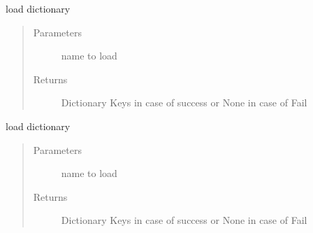 \documentclass[letterpaper,10pt,english]{sphinxmanual}
\begin{document}

\begin{fulllineitems}
\label{\detokenize{algorithms:repository.repository_service.load_carriers}}
\sphinxAtStartPar
load dictionary
\begin{quote}\begin{description}
\item[{Parameters}] \leavevmode
\sphinxAtStartPar
{} \textendash{} name to load

\item[{Returns}] \leavevmode
\sphinxAtStartPar
Dictionary Keys in case of success or None in case of Fail

\end{description}\end{quote}

\end{fulllineitems}


\begin{fulllineitems}
\label{\detokenize{algorithms:repository.repository_service.load_dic}}
\sphinxAtStartPar
load dictionary
\begin{quote}\begin{description}
\item[{Parameters}] \leavevmode
\sphinxAtStartPar
{} \textendash{} name to load

\item[{Returns}] \leavevmode
\sphinxAtStartPar
Dictionary Keys in case of success or None in case of Fail

\end{description}\end{quote}

\end{fulllineitems}

\end{document}
